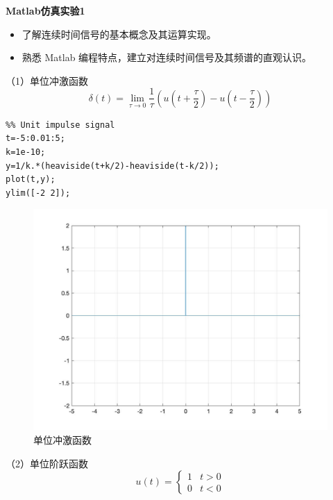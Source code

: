 \documentclass[a4paper,12pt]{ctexart}
\begin{document}
\centerline{\Large{\textbf{Matlab仿真实验1}}}

\begin{itemize}
    \item 了解连续时间信号的基本概念及其运算实现。
    \item 熟悉 Matlab 编程特点，建立对连续时间信号及其频谱的直观认识。
\end{itemize}

（1）单位冲激函数
\begin{equation}
    \delta (t)=\lim_{\tau \rightarrow 0}\frac{1}{\tau }(u(t+\frac{\tau }{2})-u(t-\frac{\tau }{2}))
\end{equation}

\begin{lstlisting}
%% Unit impulse signal
t=-5:0.01:5;
k=1e-10;
y=1/k.*(heaviside(t+k/2)-heaviside(t-k/2));
plot(t,y);
ylim([-2 2]);
\end{lstlisting}
\begin{figure}[H]
    \centering
    \includegraphics[width=14cm]{1.jpg}
    \caption{单位冲激函数}
\end{figure}

（2）单位阶跃函数
\begin{equation}
    u(t)=\left\{\begin{matrix}
        1 & t>0 \\
        0 & t<0
    \end{matrix}\right.
\end{equation}
\end{document}
